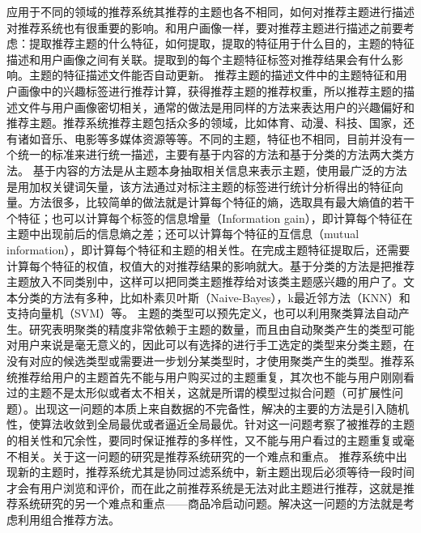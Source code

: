   应用于不同的领域的推荐系统其推荐的主题也各不相同，如何对推荐主题进行描述对推荐系统也有很重要的影响。和用户画像一样，要对推荐主题进行描述之前要考虑：提取推荐主题的什么特征，如何提取，提取的特征用于什么目的，主题的特征描述和用户画像之间有关联。提取到的每个主题特征标签对推荐结果会有什么影响。主题的特征描述文件能否自动更新。
  推荐主题的描述文件中的主题特征和用户画像中的兴趣标签进行推荐计算，获得推荐主题的推荐权重，所以推荐主题的描述文件与用户画像密切相关，通常的做法是用同样的方法来表达用户的兴趣偏好和推荐主题。推荐系统推荐主题包括众多的领域，比如体育、动漫、科技、国家，还有诸如音乐、电影等多媒体资源等等。不同的主题，特征也不相同，目前并没有一个统一的标准来进行统一描述，主要有基于内容的方法和基于分类的方法两大类方法。 基于内容的方法是从主题本身抽取相关信息来表示主题，使用最广泛的方法是用加权关键词矢量，该方法通过对标注主题的标签进行统计分析得出的特征向量。方法很多，比较简单的做法就是计算每个特征的熵，选取具有最大熵值的若干个特征；也可以计算每个标签的信息增量（Information gain），即计算每个特征在主题中出现前后的信息熵之差；还可以计算每个特征的互信息（mutual information），即计算每个特征和主题的相关性。在完成主题特征提取后，还需要计算每个特征的权值，权值大的对推荐结果的影响就大。基于分类的方法是把推荐主题放入不同类别中，这样可以把同类主题推荐给对该类主题感兴趣的用户了。文本分类的方法有多种，比如朴素贝叶斯（Naive-Bayes），k最近邻方法（KNN）和支持向量机（SVM）等。 主题的类型可以预先定义，也可以利用聚类算法自动产生。研究表明聚类的精度非常依赖于主题的数量，而且由自动聚类产生的类型可能对用户来说是毫无意义的，因此可以有选择的进行手工选定的类型来分类主题，在没有对应的候选类型或需要进一步划分某类型时，才使用聚类产生的类型。推荐系统推荐给用户的主题首先不能与用户购买过的主题重复，其次也不能与用户刚刚看过的主题不是太形似或者太不相关，这就是所谓的模型过拟合问题（可扩展性问题）。出现这一问题的本质上来自数据的不完备性，解决的主要的方法是引入随机性，使算法收敛到全局最优或者逼近全局最优。针对这一问题考察了被推荐的主题的相关性和冗余性，要同时保证推荐的多样性，又不能与用户看过的主题重复或毫不相关。关于这一问题的研究是推荐系统研究的一个难点和重点。 推荐系统中出现新的主题时，推荐系统尤其是协同过滤系统中，新主题出现后必须等待一段时间才会有用户浏览和评价，而在此之前推荐系统是无法对此主题进行推荐，这就是推荐系统研究的另一个难点和重点——商品冷启动问题。解决这一问题的方法就是考虑利用组合推荐方法。
  
